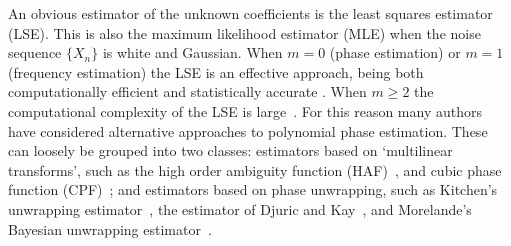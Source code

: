 \documentclass[journal]{IEEEtran}
\begin{document}
An obvious estimator of the unknown coefficients is the least squares estimator (LSE).  This is also the maximum likelihood estimator (MLE) when the noise sequence $\{X_n\}$ is white and Gaussian.  When $m=0$ (phase estimation) or $m=1$ (frequency estimation) the LSE is an effective approach, being both computationally efficient and statistically accurate \cite{Quinn2009_dasp_phase_only_information_loss,Hannan1973,Quinn2001,McKilliam_mean_dir_est_sq_arc_length2010,McKilliam2010thesis}. When $m \geq 2$ the computational complexity of the LSE is large~\cite{Oshea_cpf_2004,McKilliam2010thesis,Abatzoglou_ml_chirp_1986}. For this reason many authors have considered alternative approaches to polynomial phase estimation. These can loosely be grouped into two classes: estimators based on `multilinear transforms', such as the high order ambiguity function (HAF)~\cite{Peleg_DPT_1995,Peleg1991_est_class_PPS_1991,Porat_asympt_HAF_DPT_1996,Farquharson_another_poly_est_2005,Boashash_Oshea_1994}, and cubic phase function (CPF)~\cite{Oshea_cpf_2004,Oshea_cpf_2002_letter,Djurovic_haf_cpf_2012}; and estimators based on phase unwrapping, such as Kitchen's unwrapping estimator~\cite{Kitchen_polyphase_unwrapping_1994}, the estimator of Djuric and Kay~\cite{Djuric_phase_unwrap_chirp_1990}, and Morelande's Bayesian unwrapping estimator~\cite{Morelande_bayes_unwrapping_2009_tsp}.
\end{document}
